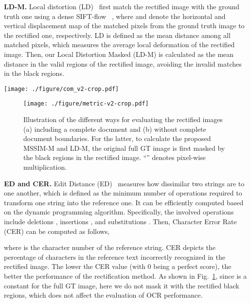 \documentclass[lettersize,journal]{IEEEtran}
\begin{document}
\smallskip
\textbf{LD-M.} Local distortion (LD)~\cite{Shaodi} first match the rectified image with the ground truth one using a dense SIFT-flow~\cite{5551153} , where  and  denote the horizontal and vertical displacement map of the matched pixels from the ground truth image to the rectified one, respectively.
LD is defined as the mean  distance among all matched pixels, which measures the average local deformation of the rectified image.
Then, our Local Distortion Masked (LD-M) is calculated as the mean  distance in the valid regions of the rectified image,
avoiding the invalid matches in the black regions.

\begin{figure*}[t]
  \centering
  \texttt{[image: ./figure/com\_v2-crop.pdf]}
  \caption{Qualitative comparisons with existing learning-based methods, including DocUNet~\cite{8578592}, DocProj~\cite{li2019document}, 
  FCN-based~\cite{xie2020dewarping}, DewarpNet~\cite{9010747}, PWUNet~\cite{das2021end}, DocTr~\cite{feng2021doctr}, DDCP~\cite{xie2021document}, DocGeoNet~\cite{feng2022geometric}, Marior~\cite{zhang2022marior}, RDGR~\cite{jiang2022revisiting}, and our DocTr++, from left to right.}
  \label{fig:qua_eva1}
\end{figure*}

\begin{figure}[t]
  \centering
  \texttt{[image: ./figure/metric-v2-crop.pdf]}
  \caption{Illustration of the different ways for evaluating the rectified images (a) including a complete document and (b) without complete document boundaries. For the latter, to calculate the proposed MSSIM-M and LD-M, the original full GT image is first masked by the black regions in the rectified image. ``'' denotes pixel-wise multiplication.}
  \label{fig:metric}
\end{figure}

\smallskip
\textbf{ED and CER.} Edit Distance (ED)~\cite{levenshtein1966binary} measures how dissimilar two strings are to one another, which is defined as the minimum number of operations required to transform one string into the reference one. It can be efficiently computed based on the dynamic programming algorithm. Specifically, the involved operations include deletions , insertions , and substitutions . Then, Character Error Rate (CER) can be computed as follows,

where  is the character number of the reference string. CER depicts the percentage of characters in the reference text incorrectly recognized in the rectified image. The lower the CER value (with 0 being a perfect score), the better the performance of the rectification method.
As shown in Fig.~\ref{fig:metric}, since  is a constant for the full GT image, 
here we do not mask it with the rectified black regions,
which does not affect the evaluation of OCR performance.
\end{document}
